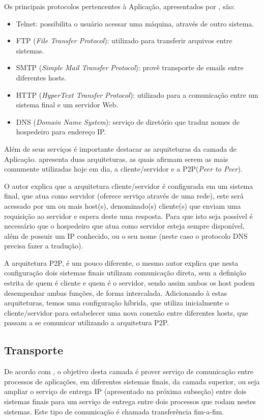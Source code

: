 Os principais protocolos pertencentes à Aplicação, apresentados por \cite{STALLINGS}, são:
\begin{itemize}
\item Telnet: possibilita o usu\'ario acessar uma m\'aquina, atrav\'es de outro sistema.
\item FTP (\textit{File Transfer Protocol}): utilizado para transferir arquivos entre sistemas.
\item SMTP (\textit{Simple Mail Transfer Protocol}): prov\^e transporte de emails entre diferentes hosts.
\item HTTP (\textit{HyperText Transfer Protocol}): utilizado para a comunicação entre um sistema final e um servidor Web.
\item DNS (\textit{Domain Name System}): serviço de diretório que traduz nomes de hospedeiro para endereço IP.
\end{itemize}

Além de seus serviços é importante destacar as arquiteturas da camada de Aplicação.  apresenta duas arquiteturas, as quais afirmam serem as mais comumente utilizadas hoje em dia, a cliente/servidor e a P2P(\textit{Peer to Peer}).

O autor explica que a arquitetura cliente/servidor é configurada em um sistema final, que atua como servidor (oferece serviço através de uma rede), este será acessado por um ou mais host(s), denominado(s) cliente(s) que enviam uma requisição ao servidor e espera deste uma resposta. Para que isto seja poss\'ivel \'e necess\'ario que o hospedeiro que atua como servidor esteja sempre disponível, além de possuir um IP conhecido, ou o seu nome (neste caso o protocolo DNS precisa fazer a traduç\~ao).

A arquitetura P2P, é um pouco diferente, o mesmo autor explica que nesta configuração dois sistemas finais utilizam comunicação direta, sem a definição estrita de quem é cliente e quem é o servidor, sendo assim ambos os host podem desempenhar ambas funções, de forma intercalada. Adicionando à estas arquiteturas, temos uma configuração híbrida, que utiliza inicialmente o cliente/servidor para estabelecer uma nova conexão entre diferentes hosts, que passam a se comunicar utilizando a arquitetura P2P.

\subsection{Transporte}

De acordo com , o objetivo desta camada é prover serviço de comunicação entre processos de aplicações, em diferentes sistemas finais, da camada superior, ou seja ampliar o serviço de entrega IP (apresentado na próxima subseção) entre dois sistemas finais para um serviço de entrega entre dois processos que rodam nestes sistemas. Este tipo de comunicação é chamada transferência fim-a-fim.

